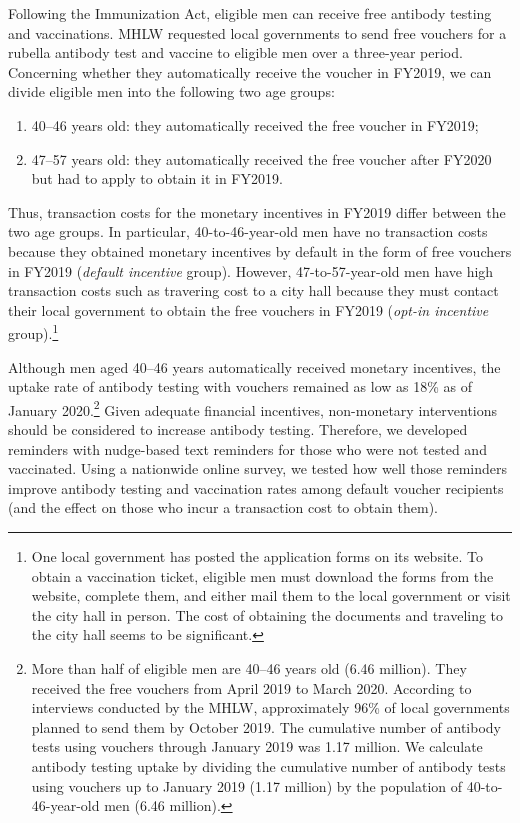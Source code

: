 \documentclass[
]{article}
\providecommand{\tightlist}{%
  \setlength{\itemsep}{0pt}\setlength{\parskip}{0pt}}
\begin{document}
Following the Immunization Act, eligible men can receive free antibody testing and vaccinations. MHLW requested local governments to send free vouchers for a rubella antibody test and vaccine to eligible men over a three-year period. Concerning whether they automatically receive the voucher in FY2019, we can divide eligible men into the following two age groups:

\begin{enumerate}
\def\labelenumi{\arabic{enumi}.}
\tightlist
\item
  40--46 years old: they automatically received the free voucher in FY2019;
\item
  47--57 years old: they automatically received the free voucher after FY2020 but had to apply to obtain it in FY2019.
\end{enumerate}

Thus, transaction costs for the monetary incentives in FY2019 differ between the two age groups. In particular, 40-to-46-year-old men have no transaction costs because they obtained monetary incentives by default in the form of free vouchers in FY2019 (\emph{default incentive} group). However, 47-to-57-year-old men have high transaction costs such as travering cost to a city hall because they must contact their local government to obtain the free vouchers in FY2019 (\emph{opt-in incentive} group).\footnote{One local government has posted the application forms on its website. To obtain a vaccination ticket, eligible men must download the forms from the website, complete them, and either mail them to the local government or visit the city hall in person. The cost of obtaining the documents and traveling to the city hall seems to be significant.}

Although men aged 40--46 years automatically received monetary incentives, the uptake rate of antibody testing with vouchers remained as low as 18\% as of January 2020.\footnote{More than half of eligible men are 40--46 years old (6.46 million). They received the free vouchers from April 2019 to March 2020. According to interviews conducted by the MHLW, approximately 96\% of local governments planned to send them by October 2019. The cumulative number of antibody tests using vouchers through January 2019 was 1.17 million. We calculate antibody testing uptake by dividing the cumulative number of antibody tests using vouchers up to January 2019 (1.17 million) by the population of 40-to-46-year-old men (6.46 million).} Given adequate financial incentives, non-monetary interventions should be considered to increase antibody testing. Therefore, we developed reminders with nudge-based text reminders for those who were not tested and vaccinated. Using a nationwide online survey, we tested how well those reminders improve antibody testing and vaccination rates among default voucher recipients (and the effect on those who incur a transaction cost to obtain them).
\end{document}
